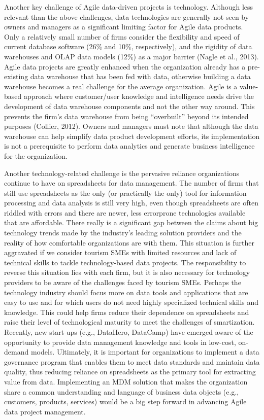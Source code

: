 \documentclass[
  letterpaper,
  DIV=11,
  numbers=noendperiod]{scrreprt}
\begin{document}
Another key challenge of Agile data-driven projects is technology.
Although less relevant than the above challenges, data technologies are
generally not seen by owners and managers as a significant limiting
factor for Agile data products. Only a relatively small number of firms
consider the flexibility and speed of current database software (26\%
and 10\%, respectively), and the rigidity of data warehouses and OLAP
data models (12\%) as a major barrier (Nagle et al., 2013). Agile data
projects are greatly enhanced when the organization already has a
pre-existing data warehouse that has been fed with data, otherwise
building a data warehouse becomes a real challenge for the average
organization. Agile is a value-based approach where customer/user
knowledge and intelligence needs drive the development of data warehouse
components and not the other way around. This prevents the firm's data
warehouse from being ``overbuilt'' beyond its intended purposes
(Collier, 2012). Owners and managers must note that although the data
warehouse can help simplify data product development efforts, its
implementation is not a prerequisite to perform data analytics and
generate business intelligence for the organization.

Another technology-related challenge is the pervasive reliance
organizations continue to have on spreadsheets for data management. The
number of firms that still use spreadsheets as the only (or practically
the only) tool for information processing and data analysis is still
very high, even though spreadsheets are often riddled with errors and
there are newer, less errorprone technologies available that are
affordable. There really is a significant gap between the claims about
big technology trends made by the industry's leading solution providers
and the reality of how comfortable organizations are with them. This
situation is further aggravated if we consider tourism SMEs with limited
resources and lack of technical skills to tackle technology-based data
projects. The responsibility to reverse this situation lies with each
firm, but it is also necessary for technology providers to be aware of
the challenges faced by tourism SMEs. Perhaps the technology industry
should focus more on data tools and applications that are easy to use
and for which users do not need highly specialized technical skills and
knowledge. This could help firms reduce their dependence on spreadsheets
and raise their level of technological maturity to meet the challenges
of smartization. Recently, new start-ups (e.g., DataHero, DataCamp) have
emerged aware of the opportunity to provide data management knowledge
and tools in low-cost, on-demand models. Ultimately, it is important for
organizations to implement a data governance program that enables them
to meet data standards and maintain data quality, thus reducing reliance
on spreadsheets as the primary tool for extracting value from data.
Implementing an MDM solution that makes the organization share a common
understanding and language of business data objects (e.g., customers,
products, services) would be a big step forward in advancing Agile data
project management.
\end{document}
